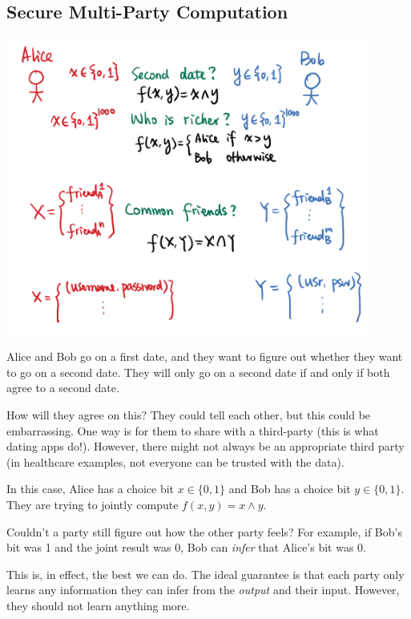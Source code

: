 \subsection{Secure Multi-Party Computation}
\begin{center}
    \includegraphics[width=0.9\textwidth]{images/2023-01-26/secure_mpc.png}
\end{center}

\begin{example*}
    Alice and Bob go on a first date, and they want to figure out whether they want to go on a second date. They will only go on a second date if and only if both agree to a second date.

    How will they agree on this? They could tell each other, but this could be embarrassing. One way is for them to share with a third-party (this is what dating apps do!). However, there might not always be an appropriate third party (in healthcare examples, not everyone can be trusted with the data).

    In this case, Alice has a choice bit $x\in\{0, 1\}$ and Bob has a choice bit $y\in\{0, 1\}$. They are trying to jointly compute $f(x, y) = x\land y$.

    \begin{remark}
        Couldn't a party still figure out how the other party feels? For example, if Bob's bit was 1 and the joint result was 0, Bob can \emph{infer} that Alice's bit was 0.

        This is, in effect, the best we can do. The ideal guarantee is that each party only learns any information they can infer from the \emph{output} and their input. However, they should not learn anything more.
    \end{remark}
\end{example*}

